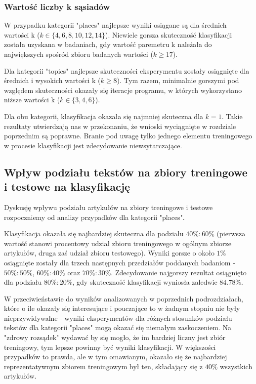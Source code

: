 \documentclass{classrep}
\begin{document}
\subsubsection{Wartość liczby k sąsiadów}
W przypadku kategorii "places" najlepsze wyniki osiągane są dla średnich wartości k ($k \in \{4, 6, 8, 10, 12, 14\}$). Niewiele gorsza skuteczność klasyfikacji została uzyskana w badaniach, gdy wartość paremetru k należała do największych spośród zbioru badanych wartości ($k\geq17$). \newline

Dla kategorii "topics" najlepsze skuteczności eksperymentu zostały osiągnięte dla średnich i wysokich wartości k ($k\geq8$). Tym razem, minimalnie gorszymi pod względem skuteczności okazały się iteracje programu, w których wykorzystano niższe wartości k ($k \in \{3, 4, 6\}$). \newline

Dla obu kategorii, klasyfikacja okazała się najmniej skuteczna dla $k=1$. Takie rezultaty utwierdzają nas w przekonaniu, że wnioski wyciągnięte w rozdziale poprzednim są poprawne. Branie pod uwagę tylko jednego elementu treningowego w procesie klasyfikacji jest zdecydowanie niewsytarczające.

\subsection{Wpływ podziału tekstów na zbiory treningowe i testowe na klasyfikację}
Dyskusję wpływu podziału artykułów na zbiory treningowe i testowe rozpoczniemy od analizy przypadków dla kategorii "places".  \newline

Klasyfikacja okazała się najbardziej skuteczna dla podziału $40\%:60\%$ (pierwsza wartość stanowi procentowy udział zbioru treningowego w ogólnym zbiorze artykułów, druga zaś udział zbioru testowego). Wyniki gorsze o około $1\%$ osiągnięte zostały dla trzech następnych przedziałów poddanych badaniom - $50\%:50\%$, $60\%:40\%$ oraz $70\%:30\%$. Zdecydowanie najgorszy rezultat osiągnięto dla podziału $80\%:20\%$, gdy skuteczność klasyfikacji wyniosła zaledwie $84.78\%$.\newline

W przeciwieństawie do wyników analizowanych w poprzednich podrozdziałach, które o ile okazały się interesujące i pouczające to w żadnym stopniu nie były nieprzywidywalne - wyniki eksperymentów dla różnych stosunków podziału tekstów dla kategorii "places" mogą okazać się niemałym zaskoczeniem. Na "zdrowy rozsądek" wydawać by się mogło, że im bardziej liczny jest zbiór treningowy, tym lepsze powinny być wyniki klasyfikacji. W większości przypadków to prawda, ale w tym omawianym, okazało się że najbardziej reprezentatywnym zbiorem treningowym był ten, składający się z $40\%$ wszystkich artykułów.\newline
\end{document}
